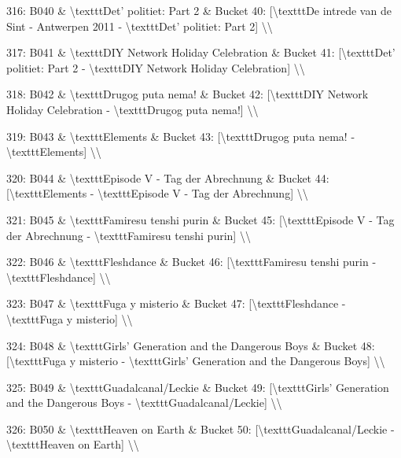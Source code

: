 \documentclass[11pt,a4paper]{article}
\begin{document}
{316: B040 \& \textbackslash{}texttt{Det' politiet: Part 2} \& Bucket 40: [\textbackslash{}texttt{De intrede van de Sint - Antwerpen 2011} - \textbackslash{}texttt{Det' politiet: Part 2}] \textbackslash{}\textbackslash{}

317: B041 \& \textbackslash{}texttt{DIY Network Holiday Celebration} \& Bucket 41: [\textbackslash{}texttt{Det' politiet: Part 2} - \textbackslash{}texttt{DIY Network Holiday Celebration}] \textbackslash{}\textbackslash{}

318: B042 \& \textbackslash{}texttt{Drugog puta nema!} \& Bucket 42: [\textbackslash{}texttt{DIY Network Holiday Celebration} - \textbackslash{}texttt{Drugog puta nema!}] \textbackslash{}\textbackslash{}

319: B043 \& \textbackslash{}texttt{Elements} \& Bucket 43: [\textbackslash{}texttt{Drugog puta nema!} - \textbackslash{}texttt{Elements}] \textbackslash{}\textbackslash{}

320: B044 \& \textbackslash{}texttt{Episode V - Tag der Abrechnung} \& Bucket 44: [\textbackslash{}texttt{Elements} - \textbackslash{}texttt{Episode V - Tag der Abrechnung}] \textbackslash{}\textbackslash{}

321: B045 \& \textbackslash{}texttt{Famiresu tenshi purin} \& Bucket 45: [\textbackslash{}texttt{Episode V - Tag der Abrechnung} - \textbackslash{}texttt{Famiresu tenshi purin}] \textbackslash{}\textbackslash{}

322: B046 \& \textbackslash{}texttt{Fleshdance} \& Bucket 46: [\textbackslash{}texttt{Famiresu tenshi purin} - \textbackslash{}texttt{Fleshdance}] \textbackslash{}\textbackslash{}

323: B047 \& \textbackslash{}texttt{Fuga y misterio} \& Bucket 47: [\textbackslash{}texttt{Fleshdance} - \textbackslash{}texttt{Fuga y misterio}] \textbackslash{}\textbackslash{}

324: B048 \& \textbackslash{}texttt{Girls' Generation and the Dangerous Boys} \& Bucket 48: [\textbackslash{}texttt{Fuga y misterio} - \textbackslash{}texttt{Girls' Generation and the Dangerous Boys}] \textbackslash{}\textbackslash{}

325: B049 \& \textbackslash{}texttt{Guadalcanal/Leckie} \& Bucket 49: [\textbackslash{}texttt{Girls' Generation and the Dangerous Boys} - \textbackslash{}texttt{Guadalcanal/Leckie}] \textbackslash{}\textbackslash{}

326: B050 \& \textbackslash{}texttt{Heaven on Earth} \& Bucket 50: [\textbackslash{}texttt{Guadalcanal/Leckie} - \textbackslash{}texttt{Heaven on Earth}] \textbackslash{}\textbackslash{}

}
\end{document}

